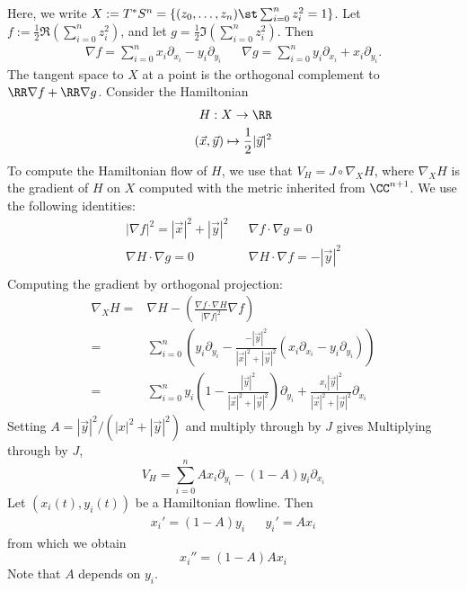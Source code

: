 
 

 Here, we write $X:=T^*S^n=\{(z_0, \ldots, z_n)\st \sum_{i=0}^n z_i^2=1\}$. Let $f:= \frac{1}{2}\Re\left(\sum_{i=0}^n z_i^2\right)$, and let $g=\frac{1}{2}\Im\left(\sum_{i=0}^n z_i^2\right)$. Then 
 \begin{align*}
    \nabla f = \sum_{i=0}^n x_i \partial_{x_i}- y_i \partial_{y_i} && \nabla g = \sum_{i=0}^n y_i \partial_{x_i} + x_i \partial_{y_i}.
 \end{align*}
The tangent space to $X$ at a point is the orthogonal complement to $\RR \nabla f + \RR \nabla g$. Consider the Hamiltonian 
\begin{align*}
    H: X\to \RR\\
    (\vec x, \vec y )\mapsto \frac{1}{2}|\vec y|^2
\end{align*}
To compute the Hamiltonian flow of $H$, we use that  $V_H=J\circ  \nabla_{X} H$, where $\nabla_X H$ is the gradient of $H$ on $X$ computed with the metric inherited from $\CC^{n+1}$.  We use the following identities:
\begin{align*}
    |\nabla f |^2 = |\vec x|^2+|\vec y|^2 &&  \nabla f \cdot    \nabla g = 0 \\
    \nabla H \cdot \nabla g = 0 && \nabla H \cdot \nabla f = -|\vec y |^2\\
\end{align*}
Computing the gradient by orthogonal projection:
\begin{align*}
    \nabla_X H =& \nabla H - \left(\frac{\nabla f \cdot \nabla H}{|\nabla f|^2}\nabla f \right)\\
    =& \sum_{i=0}^n\left(y_i \partial_{y_i}- \frac{-|\vec y|^2}{|\vec x|^2+ |\vec y|^2}( x_i \partial_{x_i}- y_i \partial_{y_i})\right) \\
    =& \sum_{i=0}^n y_i\left(1- \frac{|\vec y|^2}{|\vec x|^2 +|\vec y|^2}\right) \partial_{y_i}+ \frac{x_i|\vec y|^2}{|\vec x|^2 +|\vec y|^2}\partial_{x_i}
\end{align*}
Setting $A= |\vec y|^2/(|x|^2+|\vec y|^2)$ and multiply through by $J$ gives
Multiplying through by $J$,
\[V_H= \sum_{i=0}^n Ax_i \partial_{y_i} - (1-A)y_i \partial_{x_i}\]
Let $(x_i(t), y_i(t))$ be a Hamiltonian flowline. Then 
\begin{align*}
    x_i'=(1-A) y_i && y_i'=A x_i
\end{align*}
from which we obtain 
\[x_i''=(1-A) A x_i\]
Note that $A$ depends on $y_i$.

